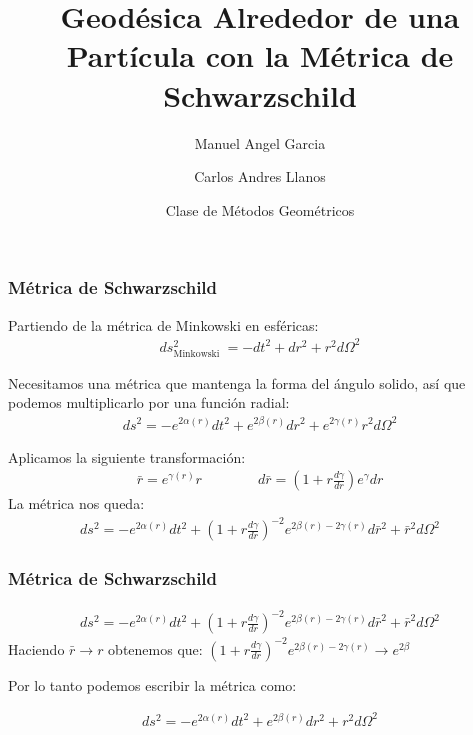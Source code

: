 \documentclass{beamer}
\title[Geodesica en Espacio de Minkowski] %
{Geodésica Alrededor de una Partícula con la Métrica de Schwarzschild}
\author[Garcia, Raisuke] %
{Manuel Angel Garcia\inst{1} \and Carlos Andres Llanos\inst{1}}
\institute[] %
{
  \inst{1}%
  Facultad de Física\\
  Universidad Nacional de Colombia
}
\date[2023] %
{Clase de Métodos Geométricos}
\begin{document}
\frame{\titlepage}

\begin{frame}
\frametitle{Métrica de Schwarzschild}

Partiendo de la métrica de Minkowski en esféricas: 
\begin{gather*}
  ds^2 _{\text{Minkowski }}  = - dt^2 + dr^2 + r^2 d \Omega^2
\end{gather*}

Necesitamos una métrica que mantenga la forma del ángulo solido, así que podemos multiplicarlo por una función radial:
\begin{gather*}
  ds^2 = - e ^ {2 \alpha (r) } dt^2 + e ^ {2 \beta(r) } dr^2 + e ^ {2\gamma(r)}r^2 d \Omega^2 
\end{gather*}

Aplicamos la siguiente transformación: 
\begin{gather*}
  \bar r = e ^ {\gamma(r)}r \qquad \qquad d\bar r = \left(1 + r \frac{d \gamma  }{d r }\right)e ^ {\gamma } dr 
\end{gather*}
La métrica nos queda: 
\begin{gather*}
  ds^2 = - e ^ {2 \alpha(r)}dt^2 + \left(1 + r \frac{d \gamma  }{d r }\right)^ {-2 } e ^ {2 \beta (r) - 2 \gamma (r) }d \bar r ^2 + \bar r ^2 d \Omega^2 
\end{gather*}

\end{frame}




\begin{frame}
\frametitle{Métrica de Schwarzschild}

\begin{gather*}
  ds^2 = - e ^ {2 \alpha(r)}dt^2 + \left(1 + r \frac{d \gamma  }{d r }\right)^ {-2 } e ^ {2 \beta (r) - 2 \gamma (r) }d \bar r ^2 + \bar r ^2 d \Omega^2 
\end{gather*}
Haciendo $ \bar r \rightarrow r  $ obtenemos que: $ \left(1 + r \frac{d \gamma  }{d r }\right)^ {-2 } e ^ {2 \beta (r) - 2 \gamma (r) } \rightarrow e ^ {2 \beta } $

\hfill 

\hfill 

Por lo tanto podemos escribir la métrica como: 

\begin{gather*}
  ds^2 = - e ^ {2\alpha(r)}dt^2 + e ^ {2 \beta (r) } dr^2 + r^2 d \Omega^2  
\end{gather*}

\end{frame}
\end{document}
